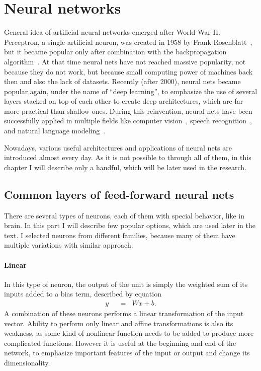 \chapter{Neural networks} \label{chp:nn}
General idea of artificial neural networks emerged after World War II. Perceptron, a single artificial neuron, was created in 1958 by Frank Rosenblatt~\cite{rosenblatt58a}, but it became popular only after combination with the backpropagation algorithm~\cite{bryson1975applied,werbos1974beyond}. At that time neural nets have not reached massive popularity, not because they do not work, but because small computing power of machines back then and also the lack of datasets. Recently (after 2000), neural nets became popular again, under the name of \textquotedblleft deep learning\textquotedblright, to emphasize the use of several layers stacked on top of each other to create deep architectures, which are far more practical than shallow ones. During this reinvention, neural nets have been successfully applied in multiple fields like computer vision~\cite{DBLP:journals/corr/HeZRS15}, speech recognition~\cite{DBLP:journals/corr/abs-1303-5778}, and natural language modeling~\cite{DBLP:conf/interspeech/MikolovKBCK10}.

Nowadays, various useful architectures and applications of neural nets are introduced almost every day. As it is not possible to through all of them, in this chapter I will describe only a handful, which will be later used in the research.

\section{Common layers of feed-forward neural nets}


There are several types of neurons, each of them with special behavior, like in brain. In this part I will describe few popular options, which are used later in the text. I selected neurons from different families, because many of them have multiple variations with similar approach.

\subsubsection{Linear}

In this type of neuron, the output of the unit is simply the weighted sum of its inputs added to a bias term, described by equation
\begin{align}
y \hspace{7pt}&=\hspace{7pt} Wx + b. \label{eq:lin}
\end{align}
A combination of these neurons performs a linear transformation of the input vector. Ability to perform only linear and affine transformations is also its weakness, as some kind of nonlinear function needs to be added to produce more complicated functions. However it is useful at the beginning and end of the network, to emphasize important features of the input or output and change its dimensionality.


